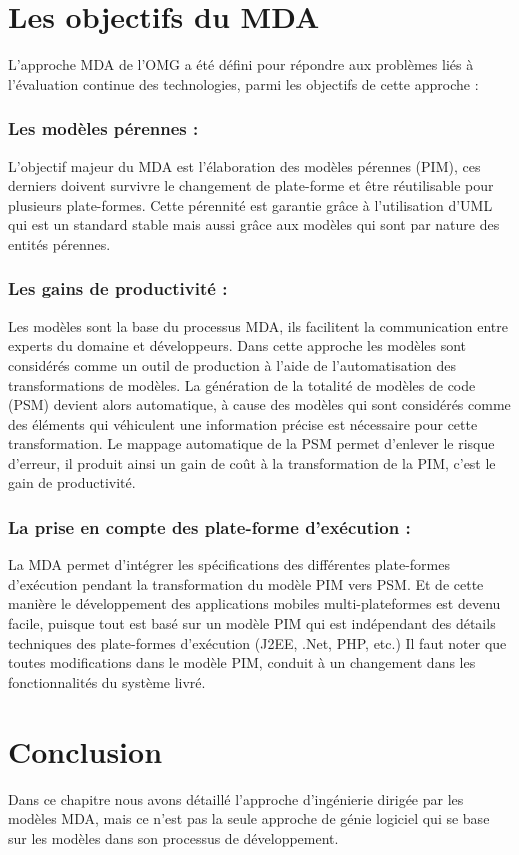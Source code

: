 \documentclass[
10pt, %
a4paper, %
oneside, %
headinclude,footinclude, %
BCOR5mm, %
]{report}
\begin{document}
				
    \section{Les objectifs du MDA }
    L’approche MDA de l’OMG a été défini pour répondre aux problèmes liés à l’évaluation continue des technologies, parmi les objectifs de cette approche : 
    \subsubsection{Les modèles pérennes :}
    L’objectif  majeur du MDA est l’élaboration des modèles pérennes (PIM), ces derniers doivent survivre le changement de plate-forme et être réutilisable pour plusieurs plate-formes.
        Cette  pérennité est garantie  grâce à l'utilisation d'UML qui est un standard stable mais aussi grâce  aux modèles qui sont par nature des entités pérennes.
    \subsubsection{Les gains de productivité :}
    Les modèles sont la base du processus MDA, ils facilitent la communication entre experts du domaine et développeurs. Dans cette approche les modèles sont considérés comme un  outil de production à l’aide de l'automatisation des transformations de modèles.
    La génération de la totalité de modèles de  code (PSM) devient alors automatique, à cause des modèles qui sont  considérés comme des  éléments qui véhiculent une information précise est nécessaire pour cette transformation. Le mappage automatique de la PSM permet  d'enlever le risque d'erreur, il produit ainsi un gain de coût à la transformation de la PIM, c’est le gain de productivité. 
    \subsubsection{La prise en compte des plate-forme d'exécution :}	
    La  MDA  permet d’intégrer  les spécifications des différentes plate-formes d'exécution pendant la transformation du modèle PIM vers PSM.  Et de cette manière le développement des applications mobiles multi-plateformes est devenu facile, puisque tout est basé sur un modèle PIM qui est indépendant des détails techniques des plate-formes d’exécution (J2EE, .Net, PHP, etc.)
    Il  faut  noter  que toutes  modifications  dans le  modèle PIM, conduit à un changement dans les fonctionnalités du système livré.

		\section{Conclusion}
		Dans ce chapitre nous avons détaillé l’approche d'ingénierie dirigée par les modèles MDA, mais ce n'est pas la seule approche de génie logiciel qui se base sur les modèles dans son processus de développement. 
										  
\end{document}
